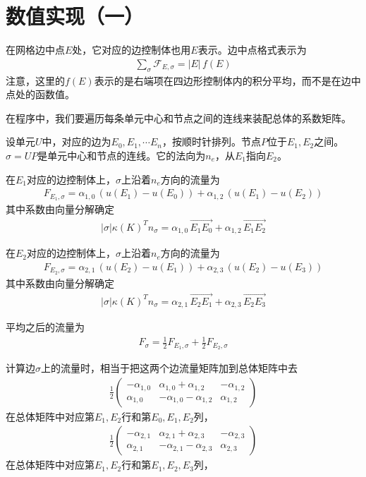\documentclass[12pt,a4paper]{article}
\theoremstyle{plain}
\begin{document}
\section*{数值实现（一）}

在网格边中点$E$处，它对应的边控制体也用$E$表示。边中点格式表示为
\begin{align*}
\sum_{\sigma} \mathcal{F}_{E, \sigma} = |E| \, f(E)
\end{align*}
注意，这里的$f(E)$表示的是右端项在四边形控制体内的积分平均，而不是在边中点处的函数值。

在程序中，我们要遍历每条单元中心和节点之间的连线来装配总体的系数矩阵。

设单元$U$中，对应的边为$E_0, E_1, \cdots E_n$，按顺时针排列。节点$P$位于$E_1, E_2$之间。$\sigma = U P$是单元中心和节点的连线。它的法向为$n_e$，从$E_1$指向$E_2$。

在$E_1$对应的边控制体上，$\sigma$上沿着$n_e$方向的流量为
\begin{align*}
F_{E_1, \sigma} = \alpha_{1,0} \, (u(E_1) - u(E_0)) + \alpha_{1,2} \, (u(E_1) - u(E_2))
\end{align*}
其中系数由向量分解确定
\begin{align*}
|\sigma| \kappa(K)^T n_{\sigma} = \alpha_{1,0} \, \overrightarrow{E_1 E_0} + \alpha_{1,2} \, \overrightarrow{E_1 E_2}
\end{align*}

在$E_2$对应的边控制体上，$\sigma$上沿着$n_e$方向的流量为
\begin{align*}
F_{E_2, \sigma} = \alpha_{2,1} \, (u(E_2) - u(E_1)) + \alpha_{2,3} \, (u(E_2) - u(E_3))
\end{align*}
其中系数由向量分解确定
\begin{align*}
|\sigma| \kappa(K)^T n_{\sigma} = \alpha_{2,1} \, \overrightarrow{E_2 E_1} + \alpha_{2,3} \, \overrightarrow{E_2 E_3}
\end{align*}

平均之后的流量为
\begin{align*}
F_{\sigma} = \frac12 F_{E_1, \sigma} + \frac12 F_{E_2, \sigma}
\end{align*}

计算边$\sigma$上的流量时，相当于把这两个边流量矩阵加到总体矩阵中去
\begin{align*}
\frac12
\left(
\begin{matrix}
-\alpha_{1,0} & \alpha_{1,0} + \alpha_{1,2} & - \alpha_{1,2} \\
\alpha_{1,0} & -\alpha_{1,0} - \alpha_{1,2} & \alpha_{1,2} 
\end{matrix}
\right)
\end{align*}
在总体矩阵中对应第$E_1, E_2$行和第$E_0, E_1, E_2$列，
\begin{align*}
\frac12
\left(
\begin{matrix}
-\alpha_{2,1} & \alpha_{2,1} + \alpha_{2,3} & - \alpha_{2,3} \\
\alpha_{2,1} & -\alpha_{2,1} - \alpha_{2,3} & \alpha_{2,3} 
\end{matrix}
\right)
\end{align*}
在总体矩阵中对应第$E_1, E_2$行和第$E_1, E_2, E_3$列，
\end{document}
